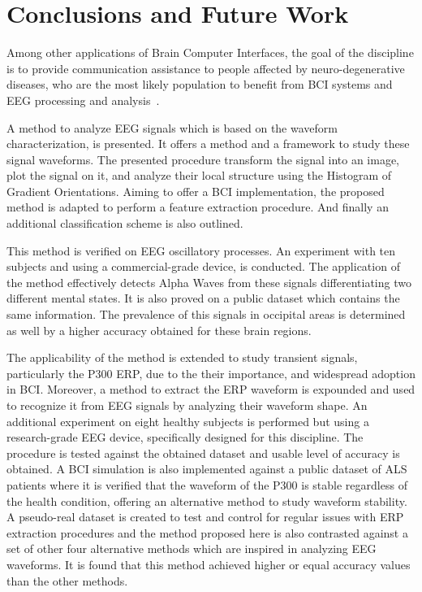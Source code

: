 \chapter{Conclusions and Future Work}
\label{chapter:seven}


Among other applications of Brain Computer Interfaces, the goal of the discipline is to provide communication assistance to people affected by neuro-degenerative diseases, who are the most likely population to benefit from BCI systems and EEG processing and analysis~\cite{WolpawJonathanR2012}.

A method to analyze EEG signals which is based on the waveform characterization, is presented.  It offers a method and a framework to study these signal waveforms. The presented procedure transform the signal into an image, plot the signal on it, and analyze their local structure using the Histogram of Gradient Orientations.   Aiming to offer a BCI implementation, the proposed method is adapted to perform a feature extraction procedure.  And finally an additional classification scheme is also outlined.

This method is verified on EEG oscillatory processes.  An experiment with ten subjects and using a commercial-grade device, is conducted.  The application of the method effectively detects Alpha Waves from these signals differentiating two different mental states.  It is also proved on a public dataset which contains the same information.  The prevalence of this signals in occipital areas is determined as well by a higher accuracy obtained for these brain regions.

The applicability of the method is extended to study transient signals, particularly the P300 ERP,  due to the their importance, and widespread adoption in BCI.  Moreover, a method to  extract the ERP waveform is expounded and used to recognize it from EEG signals by analyzing their waveform shape.  An additional experiment on eight healthy subjects is performed but using a research-grade EEG device, specifically designed for this discipline.  The procedure is tested against the obtained dataset and usable level of accuracy is obtained.  A BCI simulation is also implemented against a public dataset of ALS patients where it is verified that the waveform of the P300 is stable regardless of the health condition, offering an alternative method to study waveform stability.  A pseudo-real dataset is created to test and control for regular issues with ERP extraction procedures and the method proposed here is also contrasted against a set of other four alternative methods which are inspired in analyzing EEG waveforms.  It is found that this method achieved higher or equal accuracy values than the other methods.

